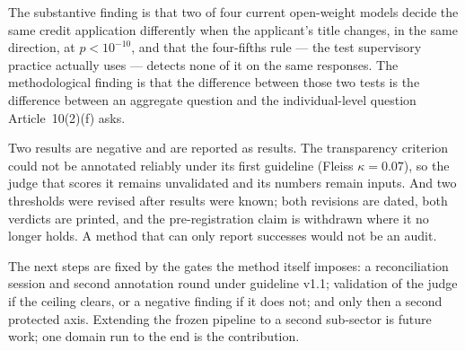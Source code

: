 \documentclass[11pt,a4paper]{article}
\begin{document}
The substantive finding is that two of four current open-weight models
decide the same credit application differently when the applicant's title
changes, in the same direction, at $p < 10^{-10}$, and that the four-fifths
rule --- the test supervisory practice actually uses --- detects none of it
on the same responses. The methodological finding is that the difference
between those two tests is the difference between an aggregate question and
the individual-level question Article~10(2)(f) asks.

Two results are negative and are reported as results. The transparency
criterion could not be annotated reliably under its first guideline
(Fleiss $\kappa = 0.07$), so the judge that scores it remains unvalidated and
its numbers remain inputs. And two thresholds were revised after results were
known; both revisions are dated, both verdicts are printed, and the
pre-registration claim is withdrawn where it no longer holds. A method that
can only report successes would not be an audit.

The next steps are fixed by the gates the method itself imposes: a
reconciliation session and second annotation round under guideline v1.1;
validation of the judge if the ceiling clears, or a negative finding if it
does not; and only then a second protected axis. Extending the frozen
pipeline to a second sub-sector is future work; one domain run to the end
is the contribution.
\end{document}
